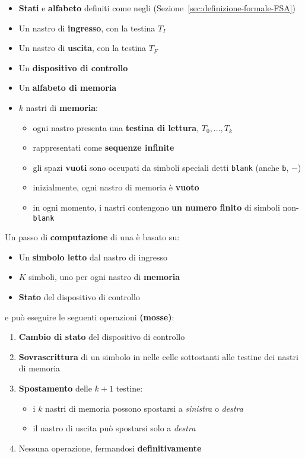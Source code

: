 \documentclass[italian, 10pt]{article}
\newcommand{\blank}{\texttt{b}} %
\begin{document}
\begin{itemize}
  \item \textbf{Stati} e \textbf{alfabeto} definiti come negli \FSA (Sezione~\ref{sec:definizione-formale-FSA})
  \item Un nastro di \textbf{ingresso}, con la testina \(T_I\)
  \item Un nastro di \textbf{uscita}, con la testina \(T_F\)
  \item Un \textbf{dispositivo di controllo}
  \item Un \textbf{alfabeto di memoria}
  \item \(k\) nastri di \textbf{memoria}:
        \begin{itemize}
          \item ogni nastro presenta una \textbf{testina di lettura}, \(T_0, \ldots, T_k\)
          \item rappresentati come \textbf{sequenze infinite}
          \item gli spazi \textbf{vuoti} sono occupati da simboli speciali detti \texttt{blank} (anche \blank, \(-\))
          \item inizialmente, ogni nastro di memoria è \textbf{vuoto}
          \item in ogni momento, i nastri contengono \textbf{un numero finito} di simboli non-\texttt{blank}
        \end{itemize}
\end{itemize}

Un passo di \textbf{computazione} di una \TM è basato su:

\begin{itemize}
  \item Un \textbf{simbolo letto} dal nastro di ingresso
  \item \(K\) simboli, uno per ogni nastro di \textbf{memoria}
  \item \textbf{Stato} del dispositivo di controllo
\end{itemize}

e può eseguire le seguenti operazioni \textbf{(mosse)}:

\begin{enumerate}
  \item \textbf{Cambio di stato} del dispositivo di controllo
  \item \textbf{Sovrascrittura} di un simbolo in nelle celle sottostanti alle testine dei nastri di memoria
  \item \textbf{Spostamento} delle \(k+1\) testine:
        \begin{itemize}[label=\(\rightarrow\)]
          \item i \(k\) nastri di memoria possono spostarsi a \textit{sinistra} o \textit{destra}
          \item il nastro di uscita può spostarsi solo a \textit{destra}
        \end{itemize}
  \item Nessuna operazione, fermandosi \textbf{definitivamente}
\end{enumerate}
\end{document}
